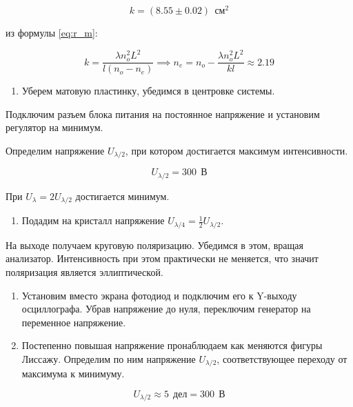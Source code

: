 \documentclass[a4paper,12pt]{article}
\begin{document}
\begin{equation*}
    k = (8.55 \pm 0.02) \ \ \text{см}^2
\end{equation*}

из формулы \eqref{eq:r_m}:

\begin{equation*}
    k = \frac{\lambda n_o^2 L^2}{l \left(n_o - n_e\right)} \implies n_e = n_o - \frac{\lambda n_o^2 L^2}{kl} \approx 2.19
\end{equation*}

\begin{enumerate}[resume]
    \item Уберем матовую пластинку, убедимся в центровке системы. 
\end{enumerate}

Подключим разъем блока питания на постоянное напряжение и установим регулятор на минимум.

Определим напряжение $U_{\lambda/2}$, при котором достигается максимум интенсивности.

\begin{equation*}
    U_{\lambda/2} = 300 \ \ \text{В}
\end{equation*}

При $U_{\lambda} = 2U_{\lambda/2}$ достигается минимум.

\begin{enumerate}[resume]
    \item Подадим на кристалл напряжение $U_{\lambda/4} = \frac{1}{2} U_{\lambda/2}$.
\end{enumerate}

На выходе получаем круговую поляризацию. Убедимся в этом, вращая анализатор. Интенсивность при этом практически не меняется, что значит поляризация является эллиптической.

\newpage
\begin{enumerate}[resume]
    \item Установим вместо экрана фотодиод и подключим его к Y-выходу осциллографа. Убрав напряжение до нуля, переключим генератор на переменное напряжение.
    \item Постепенно повышая напряжение пронаблюдаем как меняются фигуры Лиссажу. Определим по ним напряжение $U_{\lambda/2}$, соответствующее переходу от максимума к минимуму.
\end{enumerate}

\begin{equation*}
    U_{\lambda/2} \approx 5 \ \ \text{дел} = 300 \ \ \text{В}
\end{equation*}
\end{document}
